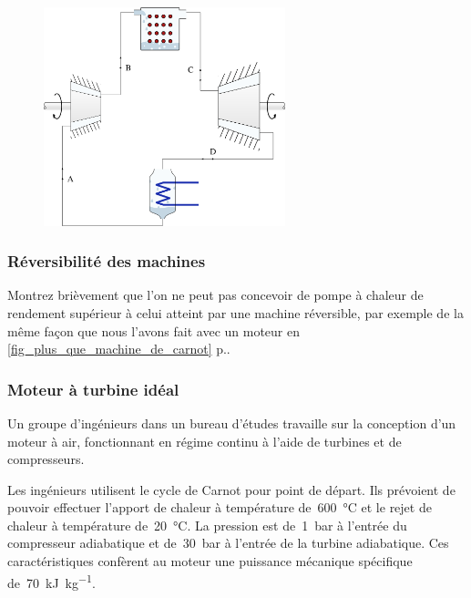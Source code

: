 	\begin{figure}[hc!]
		\begin{center}
			\includegraphics[width=7cm]{images/circuit_carnot_vapeur.png}
		\end{center}
		\label{fig_exo_carnot_circuit_vapeur}
	\end{figure}

\subsubsection{Réversibilité des machines}
\label{exo_thermopompe_plusplus}

	Montrez brièvement que l’on ne peut pas concevoir de pompe à chaleur de rendement supérieur à celui atteint par une machine réversible, par exemple de la même façon que nous l’avons fait avec un moteur en \cref{fig_plus_que_machine_de_carnot} p.\pageref{fig_plus_que_machine_de_carnot}.


\subsubsection{Moteur à turbine idéal}
\label{exo_moteur_turbine_ideal}
\wherefrom{[DS n°2 2012, 11pts]}

	Un groupe d’ingénieurs dans un bureau d’études travaille sur la conception d’un moteur à air, fonctionnant en régime continu à l’aide de turbines et de compresseurs.

	Les ingénieurs utilisent le cycle de Carnot pour point de départ. Ils prévoient de pouvoir effectuer l’apport de chaleur à température de~\SI{600}{\degreeCelsius} et le rejet de chaleur à température de~\SI{20}{\degreeCelsius}. La pression est de~\SI{1}{\bar} à l’entrée du compresseur adiabatique et de~\SI{30}{\bar} à l’entrée de la turbine adiabatique. Ces caractéristiques confèrent au moteur une puissance mécanique spécifique de~\SI{70}{\kilo\joule\per\kilogram}.

